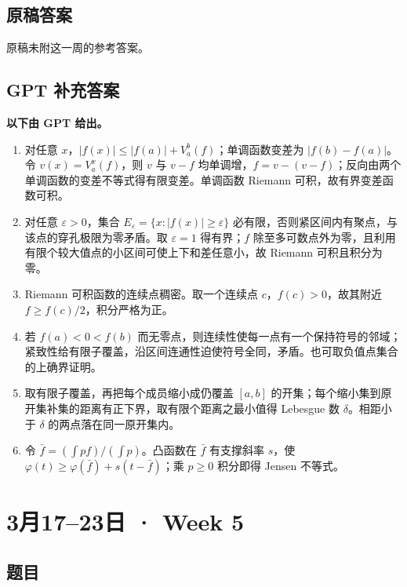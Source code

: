 \documentclass[UTF8,11pt, a4paper, oneside, fontset=none]{ctexbook}
\begin{document}
\clearpage

\subsection*{原稿答案}

\noindent 原稿未附这一周的参考答案。

\clearpage

\subsection*{GPT 补充答案}

\noindent\textbf{以下由 GPT 给出。}
\begin{enumerate}
\item 对任意 $x$，$|f(x)|\le |f(a)|+V_a^b(f)$；单调函数变差为 $|f(b)-f(a)|$。令 $v(x)=V_a^x(f)$，则 $v$ 与 $v-f$ 均单调增，$f=v-(v-f)$；反向由两个单调函数的变差不等式得有限变差。单调函数 Riemann 可积，故有界变差函数可积。
\item 对任意 $\varepsilon>0$，集合 $E_\varepsilon=\{x:|f(x)|\ge\varepsilon\}$ 必有限，否则紧区间内有聚点，与该点的穿孔极限为零矛盾。取 $\varepsilon=1$ 得有界；$f$ 除至多可数点外为零，且利用有限个较大值点的小区间可使上下和差任意小，故 Riemann 可积且积分为零。
\item Riemann 可积函数的连续点稠密。取一个连续点 $c$，$f(c)>0$，故其附近 $f\ge f(c)/2$，积分严格为正。
\item 若 $f(a)<0<f(b)$ 而无零点，则连续性使每一点有一个保持符号的邻域；紧致性给有限子覆盖，沿区间连通性迫使符号全同，矛盾。也可取负值点集合的上确界证明。
\item 取有限子覆盖，再把每个成员缩小成仍覆盖 $[a,b]$ 的开集；每个缩小集到原开集补集的距离有正下界，取有限个距离之最小值得 Lebesgue 数 $\delta$。相距小于 $\delta$ 的两点落在同一原开集内。
\item 令 $\bar f=(\int pf)/(\int p)$。凸函数在 $\bar f$ 有支撑斜率 $s$，使 $\varphi(t)\ge\varphi(\bar f)+s(t-\bar f)$；乘 $p\ge0$ 积分即得 Jensen 不等式。
\end{enumerate}

\clearpage

\section{3月17--23日 · Week 5}

\subsection*{题目}
\end{document}
